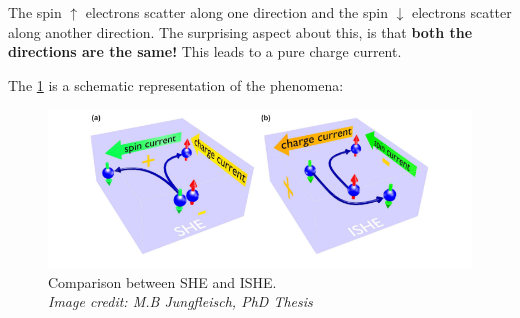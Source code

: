 The spin $\uparrow$ electrons scatter along one direction and the spin $\downarrow$ electrons scatter along another direction. The surprising aspect about this, is that \textbf{both the directions are the same!}
This leads to a pure charge current.

The \cref{she-vs-ishe} is a schematic representation of the phenomena:

\begin{figure}[h!]
    \includegraphics[width=\columnwidth]{ishe.png}
    \caption{Comparison between SHE and ISHE.\\ \vspace{0.2cm}\textit{Image credit: M.B Jungfleisch, PhD Thesis}}
    \label{she-vs-ishe}
\end{figure}

